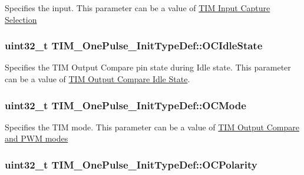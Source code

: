 Specifies the input. This parameter can be a value of \hyperlink{group___t_i_m___input___capture___selection}{T\-I\-M Input Capture Selection} \hypertarget{struct_t_i_m___one_pulse___init_type_def_aef11bcea1dbf3e3ddf2a4bbc2846bb1e}{
\subsubsection[{O\-C\-Idle\-State}]{\setlength{\rightskip}{0pt plus 5cm}uint32\-\_\-t T\-I\-M\-\_\-\-One\-Pulse\-\_\-\-Init\-Type\-Def\-::\-O\-C\-Idle\-State}}\label{struct_t_i_m___one_pulse___init_type_def_aef11bcea1dbf3e3ddf2a4bbc2846bb1e}
Specifies the T\-I\-M Output Compare pin state during Idle state. This parameter can be a value of \hyperlink{group___t_i_m___output___compare___idle___state}{T\-I\-M Output Compare Idle State}. \hypertarget{struct_t_i_m___one_pulse___init_type_def_af127f01162853e39ae616b43cc52b674}{
\subsubsection[{O\-C\-Mode}]{\setlength{\rightskip}{0pt plus 5cm}uint32\-\_\-t T\-I\-M\-\_\-\-One\-Pulse\-\_\-\-Init\-Type\-Def\-::\-O\-C\-Mode}}\label{struct_t_i_m___one_pulse___init_type_def_af127f01162853e39ae616b43cc52b674}
Specifies the T\-I\-M mode. This parameter can be a value of \hyperlink{group___t_i_m___output___compare__and___p_w_m__modes}{T\-I\-M Output Compare and P\-W\-M modes} \hypertarget{struct_t_i_m___one_pulse___init_type_def_a3028787ad41698072cbf70ddf1b6c984}{
\subsubsection[{O\-C\-Polarity}]{\setlength{\rightskip}{0pt plus 5cm}uint32\-\_\-t T\-I\-M\-\_\-\-One\-Pulse\-\_\-\-Init\-Type\-Def\-::\-O\-C\-Polarity}}\label{struct_t_i_m___one_pulse___init_type_def_a3028787ad41698072cbf70ddf1b6c984}
